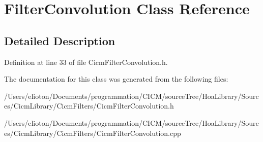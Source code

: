 \hypertarget{class_filter_convolution}{\section{Filter\-Convolution Class Reference}
\label{class_filter_convolution}
}


\subsection{Detailed Description}


Definition at line 33 of file Cicm\-Filter\-Convolution.\-h.



The documentation for this class was generated from the following files\-:\begin{DoxyCompactItemize}
\item 
/\-Users/elioton/\-Documents/programmation/\-C\-I\-C\-M/source\-Tree/\-Hoa\-Library/\-Sources/\-Cicm\-Library/\-Cicm\-Filters/Cicm\-Filter\-Convolution.\-h\item 
/\-Users/elioton/\-Documents/programmation/\-C\-I\-C\-M/source\-Tree/\-Hoa\-Library/\-Sources/\-Cicm\-Library/\-Cicm\-Filters/Cicm\-Filter\-Convolution.\-cpp\end{DoxyCompactItemize}
